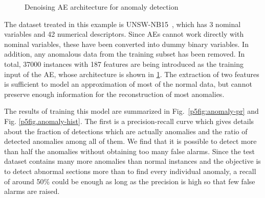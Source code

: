 \begin{figure}[ht]
    \centering\small
    \caption{Denoising AE architecture for anomaly detection}
    \label{p5fig:anomaly}
\end{figure}


The dataset treated in this example is UNSW-NB15~\cite{unsw}, which has 3 nominal variables and 42 numerical descriptors. Since AEs cannot work directly with nominal variables, these have been converted into dummy binary variables. In addition, any anomalous data from the training subset has been removed. In total, 37000 instances with 187 features  are being introduced as the training input of the AE, whose architecture is shown in \ref{p5fig:anomaly}. The extraction of two features is sufficient to model an approximation of most of the normal data, but cannot preserve enough information for the reconstruction of most anomalies. 

The results of training this model are summarized in Fig.~\ref{p5fig:anomaly-pr} and Fig. \ref{p5fig.anomaly-hist}. The first is a precision-recall curve which gives details about the fraction of detections which are actually anomalies and the ratio of detected anomalies among all of them. We find that it is possible to detect more than half the anomalies without obtaining too many false alarms. Since the test dataset contains many more anomalies than normal instances and the objective is to detect abnormal sections more than to find every individual anomaly, a recall of around 50\% could be enough as long as the precision is high so that few false alarms are raised.

